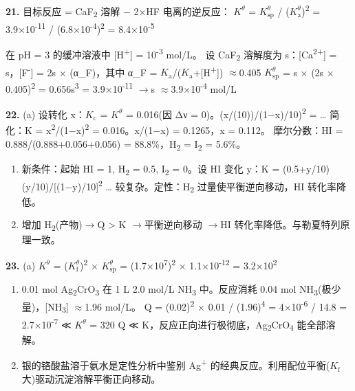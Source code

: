 \documentclass[a4paper,11pt]{ctexart}
\newcommand{\箭}{\ensuremath{\rightarrow}}
\newcommand{\左箭}{\ensuremath{\leftarrow}}
\newcommand{\上箭}{\ensuremath{\uparrow}}
\newcommand{\下箭}{\ensuremath{\downarrow}}
\newcommand{\衡}{\ensuremath{\rightleftharpoons}}
\newcommand{\双箭}{\ensuremath{\leftrightarrow}}
\newcommand{\约等于}{\ensuremath{\approx}}
\newcommand{\小于等于}{\ensuremath{\leq}}
\newcommand{\大于等于}{\ensuremath{\geq}}
\newcommand{\不等于}{\ensuremath{\neq}}
\newcommand{\西格马}{\ensuremath{\sigma}}
\newcommand{\派}{\ensuremath{\pi}}
\begin{document}
\textbf{21.} 目标反应 = CaF\textsubscript{2} 溶解 − 2×HF 电离的逆反应：
\(K^\theta\) = \(K_{\mathrm{sp}}^\theta\) / (\(K_{\mathrm a}^\theta\))\textsuperscript{2} = 3.9×10\textsuperscript{-11} / (6.8×10\textsuperscript{-4})\textsuperscript{2} = 8.4×10\textsuperscript{-5}

在 pH = 3 的缓冲溶液中 {[}H\textsuperscript{+}{]} = 10\textsuperscript{-3} mol/L。
设 CaF\textsubscript{2} 溶解度为 s：{[}Ca\textsuperscript{2+}{]} = s，{[}F\textsuperscript{-}{]} = 2s × (α\_F)，其中 α\_F = \(K_{\mathrm a}\)/(\(K_{\mathrm a}\)+{[}H\textsuperscript{+}{]}) \约等于 0.405
\(K_{\mathrm{sp}}^\theta\) = s × (2s × 0.405)\textsuperscript{2} = 0.656s\textsuperscript{3} = 3.9×10\textsuperscript{-11} \箭 s \约等于 3.9×10\textsuperscript{-4} mol/L

\textbf{22.}
(a) 设转化 x：\(K_{\mathrm c}\) = \(K^\theta\) = 0.016(因 Δν = 0)。(x/(10))/(1−x)/10)\textsuperscript{2} = \ldots{} 简化：K = x\textsuperscript{2}/(1−x)\textsuperscript{2} = 0.016。x/(1−x) = 0.1265，x = 0.112。
摩尔分数：HI = 0.888/(0.888+0.056+0.056) = 88.8\%，H\textsubscript{2} = I\textsubscript{2} = 5.6\%。

\begin{enumerate}
\def\labelenumi{(\alph{enumi})}
\setcounter{enumi}{1}
\item
  新条件：起始 HI = 1, H\textsubscript{2} = 0.5, I\textsubscript{2} = 0。设 HI 变化 y：K = (0.5+y/10)(y/10)/{[}(1−y)/10{]}\textsuperscript{2} \ldots{} 较复杂。定性：H\textsubscript{2} 过量使平衡逆向移动，HI 转化率降低。
\item
  增加 H\textsubscript{2}(产物)\箭 Q \textgreater{} K \箭 平衡逆向移动 \箭 HI 转化率降低。与勒夏特列原理一致。
\end{enumerate}

\textbf{23.}
(a) \(K^\theta\) = (\(K_{\mathrm f}^\theta\))\textsuperscript{2} × \(K_{\mathrm{sp}}^\theta\) = (1.7×10\textsuperscript{7})\textsuperscript{2} × 1.1×10\textsuperscript{-12} = 3.2×10\textsuperscript{2}

\begin{enumerate}
\def\labelenumi{(\alph{enumi})}
\setcounter{enumi}{1}
\item
  0.01 mol Ag\textsubscript{2}CrO\textsubscript{3} 在 1 L 2.0 mol/L NH\textsubscript{3} 中。反应消耗 0.04 mol NH\textsubscript{3}(极少量)，{[}NH\textsubscript{3}{]} \约等于 1.96 mol/L。
  Q = (0.02)\textsuperscript{2} × 0.01 / (1.96)\textsuperscript{4} = 4×10\textsuperscript{-6} / 14.8 = 2.7×10\textsuperscript{-7} ≪ \(K^\theta\) = 320
  Q ≪ K，反应正向进行极彻底，Ag\textsubscript{2}CrO\textsubscript{4} 能全部溶解。
\item
  银的铬酸盐溶于氨水是定性分析中鉴别 Ag\textsuperscript{+} 的经典反应。利用配位平衡(\(K_{\mathrm f}\) 大)驱动沉淀溶解平衡正向移动。
\end{enumerate}
\end{document}
